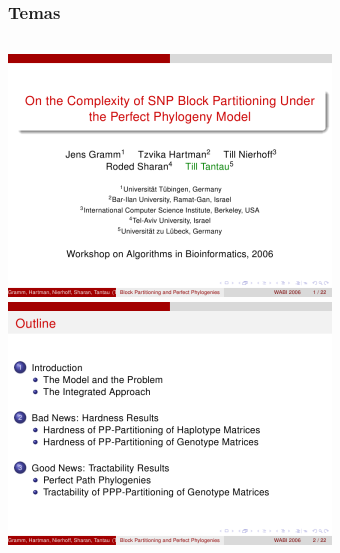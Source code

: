 \documentclass{beamer}
\begin{document}
\begin{frame}
   \frametitle{Temas}
   \begin{columns}
      \includegraphics[width=0.45\paperwidth]{imagens/CambridgeUS01.png}
      \includegraphics[width=0.45\paperwidth]{imagens/CambridgeUS02.png}
   \end{columns}
\end{frame}
\end{document}
